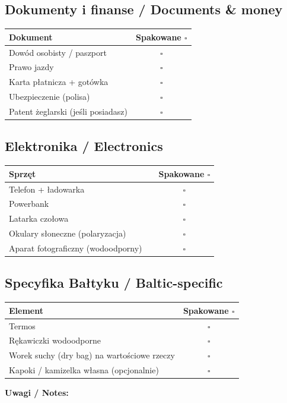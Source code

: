 \documentclass[a4paper,11pt]{article}
\begin{document}
\vspace{0.3cm}

\subsection*{Dokumenty i finanse / Documents \& money}
\begin{tabularx}{\linewidth}{|X|c|}
\hline
\textbf{Dokument} & \textbf{Spakowane \(\square\)} \\
\hline
Dowód osobisty / paszport & \(\square\) \\[4pt]\hline
Prawo jazdy & \(\square\) \\[4pt]\hline
Karta płatnicza + gotówka & \(\square\) \\[4pt]\hline
Ubezpieczenie (polisa) & \(\square\) \\[4pt]\hline
Patent żeglarski (jeśli posiadasz) & \(\square\) \\[4pt]\hline
\end{tabularx}

\vspace{0.3cm}

\subsection*{Elektronika / Electronics}
\begin{tabularx}{\linewidth}{|X|c|c|}
\hline
\textbf{Sprzęt} & & \textbf{Spakowane \(\square\)} \\
\hline
Telefon + ładowarka & & \(\square\) \\[4pt]\hline
Powerbank & & \(\square\) \\[4pt]\hline
Latarka czołowa & & \(\square\) \\[4pt]\hline
Okulary słoneczne (polaryzacja) & & \(\square\) \\[4pt]\hline
Aparat fotograficzny (wodoodporny) & & \(\square\) \\[4pt]\hline
\end{tabularx}

\vspace{0.3cm}

\subsection*{Specyfika Bałtyku / Baltic-specific}
\begin{tabularx}{\linewidth}{|X|c|}
\hline
\textbf{Element} & \textbf{Spakowane \(\square\)} \\
\hline
Termos & \(\square\) \\[4pt]\hline
Rękawiczki wodoodporne & \(\square\) \\[4pt]\hline
Worek suchy (dry bag) na wartościowe rzeczy & \(\square\) \\[4pt]\hline
Kapoki / kamizelka własna (opcjonalnie) & \(\square\) \\[4pt]\hline
\end{tabularx}

\vspace{0.4cm}
\noindent\textbf{Uwagi / Notes:}
\begin{tabularx}{\linewidth}{|X|}
\hline
\\[2cm]
\hline
\end{tabularx}
\end{document}
